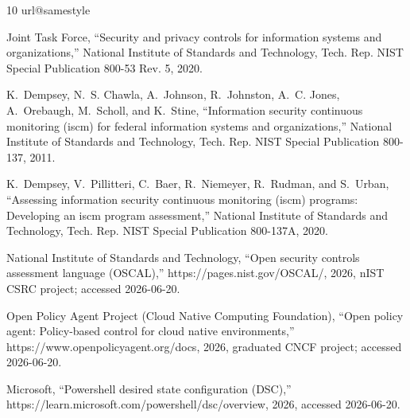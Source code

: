 \documentclass[journal]{IEEEtran}
\begin{document}
\begin{thebibliography}{10}
\providecommand{\url}[1]{#1}
\csname url@samestyle\endcsname
\providecommand{\newblock}{\relax}
\providecommand{\bibinfo}[2]{#2}
\providecommand{\BIBentrySTDinterwordspacing}{\spaceskip=0pt\relax}
\providecommand{\BIBentryALTinterwordstretchfactor}{4}
\providecommand{\BIBentryALTinterwordspacing}{\spaceskip=\fontdimen2\font plus
\BIBentryALTinterwordstretchfactor\fontdimen3\font minus
  \fontdimen4\font\relax}
\providecommand{\BIBforeignlanguage}[2]{{%
\expandafter\ifx\csname l@#1\endcsname\relax
\typeout{** WARNING: IEEEtran.bst: No hyphenation pattern has been}%
\typeout{** loaded for the language `#1'. Using the pattern for}%
\typeout{** the default language instead.}%
\else
\language=\csname l@#1\endcsname
\fi
#2}}
\providecommand{\BIBdecl}{\relax}
\BIBdecl

{Joint Task Force}, ``Security and privacy controls for information systems and
  organizations,'' National Institute of Standards and Technology, Tech. Rep.
  NIST Special Publication 800-53 Rev. 5, 2020.

K.~Dempsey, N.~S. Chawla, A.~Johnson, R.~Johnston, A.~C. Jones, A.~Orebaugh,
  M.~Scholl, and K.~Stine, ``Information security continuous monitoring (iscm)
  for federal information systems and organizations,'' National Institute of
  Standards and Technology, Tech. Rep. NIST Special Publication 800-137, 2011.

K.~Dempsey, V.~Pillitteri, C.~Baer, R.~Niemeyer, R.~Rudman, and S.~Urban,
  ``Assessing information security continuous monitoring (iscm) programs:
  Developing an iscm program assessment,'' National Institute of Standards and
  Technology, Tech. Rep. NIST Special Publication 800-137A, 2020.

{National Institute of Standards and Technology}, ``Open security controls
  assessment language ({OSCAL}),'' \url{https://pages.nist.gov/OSCAL/}, 2026,
  nIST CSRC project; accessed 2026-06-20.

{Open Policy Agent Project (Cloud Native Computing Foundation)}, ``Open policy
  agent: Policy-based control for cloud native environments,''
  \url{https://www.openpolicyagent.org/docs}, 2026, graduated CNCF project;
  accessed 2026-06-20.

{Microsoft}, ``Powershell desired state configuration ({DSC}),''
  \url{https://learn.microsoft.com/powershell/dsc/overview}, 2026, accessed
  2026-06-20.


\end{thebibliography}
\end{document}
